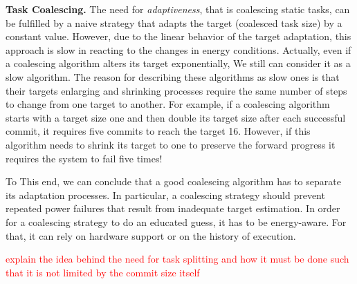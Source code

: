 \textbf{Task Coalescing.} 
The need for \emph{adaptiveness}, that is coalescing static tasks, can be fulfilled by a naive strategy that adapts the target (coalesced task size) by a constant value. However, due to the linear behavior of the target adaptation, this approach is slow in reacting to the changes in energy conditions. Actually, even if a coalescing algorithm alters its target exponentially, We still can consider it as a slow algorithm. The reason for describing these algorithms as slow ones is that their targets enlarging and shrinking processes require the same number of steps to change from one target to another. For example, if a coalescing algorithm starts with a target size one and then double its target size after each successful commit, it requires five commits to reach the target 16. However, if this algorithm needs to shrink its target to one to preserve the forward progress it requires the system to fail five times!

To This end, we can conclude that a good coalescing algorithm has to separate its adaptation processes. In particular, a coalescing strategy should prevent repeated power failures that result from inadequate target estimation. In order for a coalescing strategy to do an educated guess, it has to be energy-aware. For that, it can rely on hardware support or on the history of execution. 

\textcolor{red}{explain the idea behind the need for task splitting and how it must be done such that it is not limited by the commit size itself}



